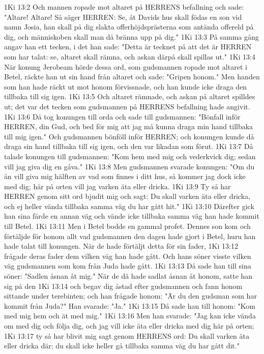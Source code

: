1Ki 13:2  Och mannen ropade mot altaret på HERRENS befallning och sade: "Altare! Altare! Så säger HERREN: Se, åt Davids hus skall födas en son vid namn Josia, han skall på dig slakta offerhöjdsprästerna som antända offereld på dig, och människoben skall man då bränna upp på dig."
1Ki 13:3  På samma gång angav han ett tecken, i det han sade: "Detta är tecknet på att det är HERREN som har talat: se, altaret skall rämna, och askan därpå skall spillas ut."
1Ki 13:4  När konung Jerobeam hörde dessa ord, som gudsmannen ropade mot altaret i Betel, räckte han ut sin hand från altaret och sade: "Gripen honom." Men handen som han hade räckt ut mot honom förvissnade, och han kunde icke draga den tillbaka till sig igen.
1Ki 13:5  Och altaret rämnade, och askan på altaret spilldes ut; det var det tecken som gudsmannen på HERRENS befallning hade angivit.
1Ki 13:6  Då tog konungen till orda och sade till gudsmannen: "Bönfall inför HERREN, din Gud, och bed för mig att jag må kunna draga min hand tillbaka till mig igen." Och gudsmannen bönföll inför HERREN; och konungen kunde då draga sin hand tillbaka till sig igen, och den var likadan som förut.
1Ki 13:7  Då talade konungen till gudsmannen: "Kom hem med mig och vederkvick dig; sedan vill jag giva dig en gåva."
1Ki 13:8  Men gudsmannen svarade konungen: "Om du än vill giva mig hälften av vad som finnes i ditt hus, så kommer jag dock icke med dig; här på orten vill jag varken äta eller dricka.
1Ki 13:9  Ty så har HERREN genom sitt ord bjudit mig och sagt: Du skall varken äta eller dricka, och ej heller vända tillbaka samma väg du har gått hit."
1Ki 13:10  Därefter gick han sina färde en annan väg och vände icke tillbaka samma väg han hade kommit till Betel.
1Ki 13:11  Men i Betel bodde en gammal profet. Dennes son kom och förtäljde för honom allt vad gudsmannen den dagen hade gjort i Betel, huru han hade talat till konungen. När de hade förtäljt detta för sin fader,
1Ki 13:12  frågade deras fader dem vilken väg han hade gått. Och hans söner visste vilken väg gudsmannen som kom från Juda hade gått.
1Ki 13:13  Då sade han till sina söner: "Sadlen åsnan åt mig." När de då hade sadlat åsnan åt honom, satte han sig på den
1Ki 13:14  och begav dig åstad efter gudsmannen och fann honom sittande under terebinten; och han frågade honom: "Är du den gudsman som har kommit från Juda?" Han svarade: "Ja."
1Ki 13:15  Då sade han till honom: "Kom med mig hem och ät med mig."
1Ki 13:16  Men han svarade: "Jag kan icke vända om med dig och följa dig, och jag vill icke äta eller dricka med dig här på orten;
1Ki 13:17  ty så har blivit mig sagt genom HERRENS ord: Du skall varken äta eller dricka där; du skall icke heller gå tillbaka samma väg du har gått dit."
